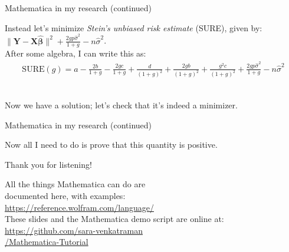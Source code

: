 \documentclass[dvipsnames]{beamer}
\let\b\mathbf
\let\bg\boldsymbol
\newcommand{\1}{\mathds{1}}	%
\begin{document}
\begin{frame}{Mathematica in my research (continued)}
	
{\small Instead let's minimize \textit{Stein's unbiased risk estimate} (SURE), given by:\\[.5em] 
$\|\b Y - \b X\bg{\hat\beta}\|^2 + \frac{2gp\hat\sigma^2}{1+g}-n\hat\sigma^2$.\\[1em]

After some algebra, I can write this as:
{\scriptsize\begin{align*}
\text{SURE}(g)= a-\frac{2b}{1+g}-\frac{2gc}{1+g}+\frac{d}{(1+g)^2}+\frac{2gb}{(1+g)^2}+\frac{g^2c}{(1+g)^2}+\frac{2gp\hat\sigma^2}{1+g}-n\hat\sigma^2
\end{align*}}\\[-1em]
\begin{figure}[H]
\centering{}	
\end{figure}
Now we have a solution; let's check that it's indeed a minimizer.}
\end{frame}

\begin{frame}{Mathematica in my research (continued)}

\begin{figure}[H]
\centering{}	
\end{figure}
Now all I need to do is prove that this quantity is positive.
\end{frame}



\begin{frame}
\begin{center}
{\Large\color{titleText} Thank you for listening!\\[2em]}

All the things Mathematica can do are\\ documented here, with examples:\\ {\color{RoyalBlue}\url{https://reference.wolfram.com/language/}} \\[2em]

These slides and the Mathematica demo script are online at:\\
{\color{RoyalBlue}\url{https://github.com/sara-venkatraman}\\ \url{/Mathematica-Tutorial}}
\end{center}
\end{frame}

\end{document}
